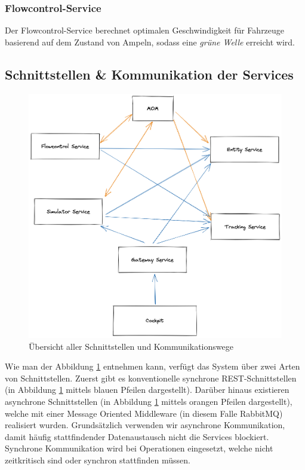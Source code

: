 \subsubsection{Flowcontrol-Service}

Der Flowcontrol-Service berechnet optimalen Geschwindigkeit für Fahrzeuge basierend auf dem Zustand von Ampeln, sodass eine \textit{grüne Welle} erreicht wird. 

\subsection{Schnittstellen \& Kommunikation der Services}

\begin{figure}[h]
	\centering
	\includegraphics[width=1\textwidth]{./figures/whole_system_communication.png}
	\caption{Übersicht aller Schnittstellen und Kommunikationswege}
	\label{fig:wholesystem_view}
\end{figure}

Wie man der Abbildung \ref{fig:wholesystem_view} entnehmen kann, verfügt das System über zwei Arten von Schnittstellen.
Zuerst gibt es konventionelle synchrone REST-Schnittstellen (in Abbildung \ref{fig:wholesystem_view} mittels blauen Pfeilen dargestellt).
Darüber hinaus existieren asynchrone Schnittstellen (in Abbildung \ref{fig:wholesystem_view} mittels orangen Pfeilen dargestellt), welche mit einer Message Oriented Middleware (in diesem Falle RabbitMQ) realisiert wurden.
Grundsätzlich verwenden wir asynchrone Kommunikation, damit häufig stattfindender Datenaustausch nicht die Services blockiert.
Synchrone Kommunikation wird bei Operationen eingesetzt, welche nicht zeitkritisch sind oder synchron stattfinden müssen.

